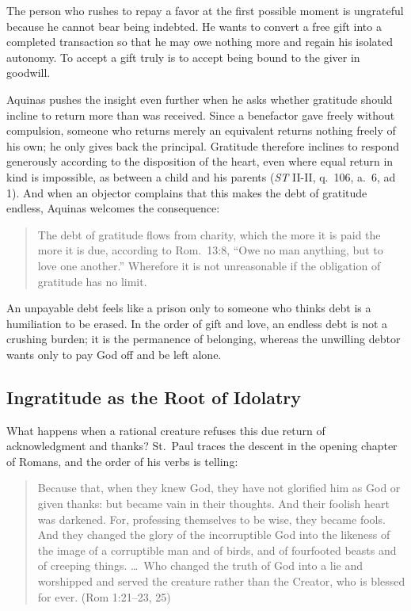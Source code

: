 The person who rushes to repay a favor at the first possible moment is ungrateful because he cannot bear being indebted. He wants to convert a free gift into a completed transaction so that he may owe nothing more and regain his isolated autonomy. To accept a gift truly is to accept being bound to the giver in goodwill.

Aquinas pushes the insight even further when he asks whether gratitude should incline to return more than was received. Since a benefactor gave freely without compulsion, someone who returns merely an equivalent returns nothing freely of his own; he only gives back the principal. Gratitude therefore inclines to respond generously according to the disposition of the heart, even where equal return in kind is impossible, as between a child and his parents (\emph{ST} II-II, q.\ 106, a.\ 6, ad 1). And when an objector complains that this makes the debt of gratitude endless, Aquinas welcomes the consequence:

\begin{quote}
The debt of gratitude flows from charity, which the more it is paid the more it is due, according to Rom.\ 13:8, ``Owe no man anything, but to love one another.'' Wherefore it is not unreasonable if the obligation of gratitude has no limit.
\end{quote}

An unpayable debt feels like a prison only to someone who thinks debt is a humiliation to be erased. In the order of gift and love, an endless debt is not a crushing burden; it is the permanence of belonging, whereas the unwilling debtor wants only to pay God off and be left alone.

\subsection{Ingratitude as the Root of Idolatry}

What happens when a rational creature refuses this due return of acknowledgment and thanks? St.\ Paul traces the descent in the opening chapter of Romans, and the order of his verbs is telling:

\begin{quote}
Because that, when they knew God, they have not glorified him as God or given thanks: but became vain in their thoughts. And their foolish heart was darkened. For, professing themselves to be wise, they became fools. And they changed the glory of the incorruptible God into the likeness of the image of a corruptible man and of birds, and of fourfooted beasts and of creeping things. \dots\ Who changed the truth of God into a lie and worshipped and served the creature rather than the Creator, who is blessed for ever. (Rom 1:21--23, 25)
\end{quote}

